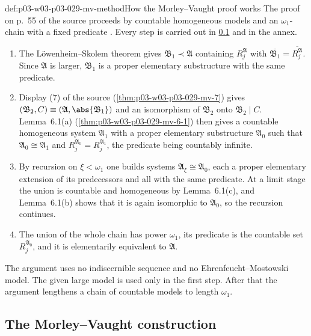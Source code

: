 \begin{hbmethod}{def:p03-w03-p03-029-mv-method}{How the Morley--Vaught proof works}
The proof on p.~55 of the source proceeds by countable homogeneous models and
an \(\omega_1\)-chain with a fixed predicate
\cite[p.~55, proof of Theorem~6.2]{MorleyVaught1962}. Every step is carried
out in \cref{sec:p03-w03-p03-029-mv-construction} and in the annex.
\begin{enumerate}
  \item The L\"owenheim--Skolem theorem gives \(\mathfrak B_1\prec\mathfrak
        A\) containing \(R_j^{\mathfrak A}\) with
        \(\overline{\mathfrak B_1}=\overline{R_j^{\mathfrak A}}\).
        Since \(\mathfrak A\) is larger, \(\mathfrak B_1\) is a proper
        elementary substructure with the same predicate.
  \item Display (7) of the source (\cref{thm:p03-w03-p03-029-mv-7}) gives
        \((\mathfrak B_2,C)\equiv(\mathfrak A,\abs{\mathfrak B_1})\) and an
        isomorphism of \(\mathfrak B_2\) onto \(\mathfrak B_2\mathbin{|} C\).
        Lemma~6.1(a) (\cref{thm:p03-w03-p03-029-mv-6-1}) then gives a
        countable homogeneous system \(\mathfrak A_1\) with a proper
        elementary substructure \(\mathfrak A_0\) such that
        \(\mathfrak A_0\cong\mathfrak A_1\) and
        \(R_j^{\mathfrak A_0}=R_j^{\mathfrak A_1}\), the predicate being
        countably infinite.
  \item By recursion on \(\xi<\omega_1\) one builds systems
        \(\mathfrak A_\xi\cong\mathfrak A_0\), each a proper elementary
        extension of its predecessors and all with the same predicate. At a
        limit stage the union is countable and homogeneous by
        Lemma~6.1(c), and Lemma~6.1(b) shows that it is again isomorphic to
        \(\mathfrak A_0\), so the recursion continues.
  \item The union of the whole chain has power \(\omega_1\), its
        predicate is the countable set \(R_j^{\mathfrak A_0}\), and it is
        elementarily equivalent to \(\mathfrak A\).
\end{enumerate}
The argument uses no indiscernible sequence and no
Ehrenfeucht--Mostowski model. The given large model is used only in the
first step. After that the argument lengthens a chain of countable models to
length \(\omega_1\).
\end{hbmethod}

\subsection{The Morley--Vaught construction}
\label{sec:p03-w03-p03-029-mv-construction}

